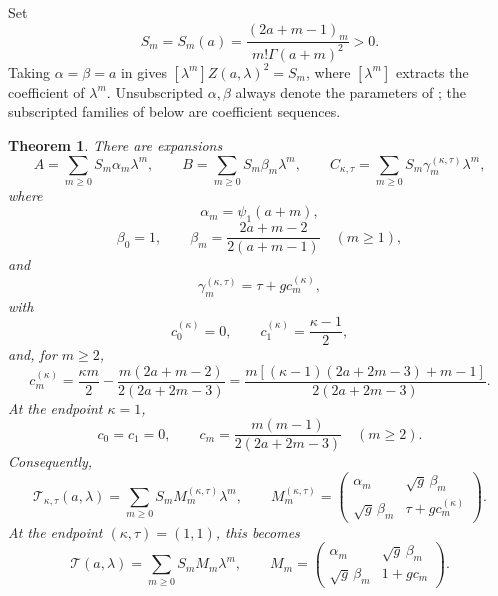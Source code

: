 \documentclass[11pt,a4paper]{amsart}
\numberwithin{equation}{section}
\theoremstyle{plain}
\newtheorem{theorem}{Theorem}[section]
\theoremstyle{definition}
\newcommand{\Turan}{\mathcal T}
\begin{document}
Set
\[
 S_m=S_m(a)=\frac{(2a+m-1)_m}{m!\Gamma(a+m)^2}>0.
\]
Taking \(\alpha=\beta=a\) in  gives
\([\lambda^m]Z(a,\lambda)^2=S_m\),
where \([\lambda^m]\) extracts the coefficient of \(\lambda^m\).  Unsubscripted
\(\alpha,\beta\) always denote the parameters of ; the
subscripted families of  below are coefficient sequences.

\begin{theorem}\label{thm:coefficients}
There are expansions
\begin{equation}\label{eq:ABC-expansions}
 A=\sum_{m\ge0}S_m\alpha_m\lambda^m,
 \qquad
 B=\sum_{m\ge0}S_m\beta_m\lambda^m,
 \qquad
 C_{\kappa,\tau}=\sum_{m\ge0}S_m\gamma_m^{(\kappa,\tau)}\lambda^m,
\end{equation}
where
\begin{equation}\label{eq:alpha}
 \alpha_m=\psi_1(a+m),
\end{equation}
\begin{equation}\label{eq:beta}
 \beta_0=1,
 \qquad
 \beta_m=\frac{2a+m-2}{2(a+m-1)}\quad(m\ge1),
\end{equation}
and
\begin{equation}\label{eq:gamma-kappa}
 \gamma_m^{(\kappa,\tau)}=\tau+g c_m^{(\kappa)},
\end{equation}
with
\begin{equation}\label{eq:cm-kappa}
 c_0^{(\kappa)}=0,
 \qquad
 c_1^{(\kappa)}=\frac{\kappa-1}{2},
\end{equation}
and, for \(m\ge2\),
\begin{equation}\label{eq:cm-kappa-general}
 c_m^{(\kappa)}
 =\frac{\kappa m}{2}
 -\frac{m(2a+m-2)}{2(2a+2m-3)}
 =\frac{m\left[(\kappa-1)(2a+2m-3)+m-1\right]}
 {2(2a+2m-3)}.
\end{equation}
At the endpoint \(\kappa=1\),
\[
 c_0=c_1=0,
 \qquad
 c_m=\frac{m(m-1)}{2(2a+2m-3)}\quad(m\ge2).
\]
Consequently,
\begin{equation}\label{eq:matrix-series-general}
 \Turan_{\kappa,\tau}(a,\lambda)
 =\sum_{m\ge0}S_mM_m^{(\kappa,\tau)}\lambda^m,
 \qquad
 M_m^{(\kappa,\tau)}=
 \begin{pmatrix}
 \alpha_m&\sqrt g\,\beta_m\\
 \sqrt g\,\beta_m&\tau+gc_m^{(\kappa)}
 \end{pmatrix}.
\end{equation}
At the endpoint \((\kappa,\tau)=(1,1)\), this becomes
\begin{equation}\label{eq:matrix-series}
 \Turan(a,\lambda)=\sum_{m\ge0}S_mM_m\lambda^m,
 \qquad
 M_m=
 \begin{pmatrix}
 \alpha_m&\sqrt g\,\beta_m\\
 \sqrt g\,\beta_m&1+gc_m
 \end{pmatrix}.
\end{equation}
\end{theorem}
\end{document}

